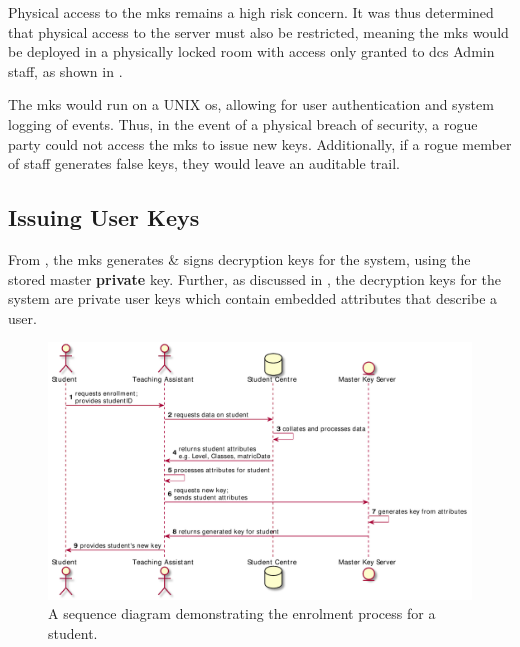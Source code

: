 Physical access to the \acrshort{mks} remains a high risk concern. It was thus determined that physical access to the server must also be restricted, meaning the \acrshort{mks} would be deployed in a physically locked room with access only granted to \acrshort{dcs} Admin staff, as shown in .

The \acrshort{mks} would run on a UNIX \acrshort{os}, allowing for user authentication and system logging of events. Thus, in the event of a physical breach of security, a rogue party could not access the \acrshort{mks} to issue new keys. Additionally, if a rogue member of staff generates false keys, they would leave an auditable trail.

\subsection{Issuing User Keys}
\label{subsec:analysis_deployment_iuk}

From , the \acrfull{mks} generates \& signs decryption keys for the \theResServer system, using the stored master \textbf{private} key. Further, as discussed in , the decryption keys for the system are private user keys which contain embedded attributes that describe a user.

\begin{figure}[htp]
    \centering
    \includegraphics[width=\linewidth,keepaspectratio]{images/flow_of_info/enrollment_stu_sequence.pdf}

    \caption{A sequence diagram demonstrating the \theResServer enrolment process for a student.}

    \label{fig:enrolment_diagram}
\end{figure}

